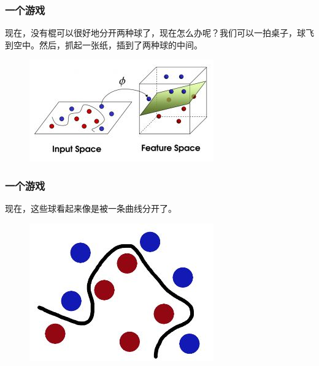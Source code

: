 \begin{frame}
\frametitle{一个游戏}	
现在，没有棍可以很好地分开两种球了，现在怎么办呢？我们可以一拍桌子，球飞到空中。然后，抓起一张纸，插到了两种球的中间。
           
	\begin{figure}[ht]
	\centering
	\includegraphics[width=0.5\linewidth]{partition/img/svm_8.jpg}  
	\end{figure}

\end{frame} 

\begin{frame}
\frametitle{一个游戏}	
现在，这些球看起来像是被一条曲线分开了。
           
	\begin{figure}[ht]
	\centering
	\includegraphics[width=0.5\linewidth]{partition/img/svm_9.jpg}  
	\end{figure}

\end{frame} 


